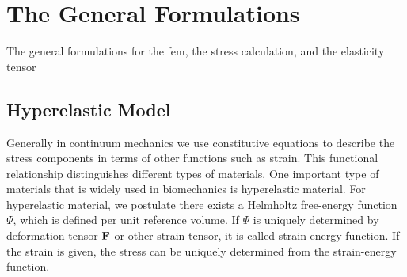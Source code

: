\section{The General Formulations}
The general formulations for the fem, the stress calculation, and the elasticity tensor
%
\subsection{Hyperelastic Model}
Generally in continuum mechanics we use constitutive equations to describe the stress components in terms of other functions such as strain. This functional relationship distinguishes different types of materials. One important type of materials that is widely used in biomechanics is hyperelastic material. For hyperelastic material, we postulate there exists a Helmholtz free-energy function $\Psi$, which is defined per unit reference volume. If $\Psi$ is uniquely determined by deformation tensor $\bold{F}$ or other strain tensor, it is called strain-energy function. If the strain is given, the stress can be uniquely determined from the strain-energy function.  

